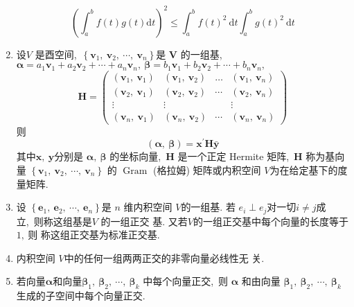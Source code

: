 \begin{enumerate}
		$$\left(\int_{a}^{b} f(t) g(t) \mathrm{d} t\right)^{2} \leqslant \int_{a}^{b} f(t)^{2} \mathrm{~d} t \int_{a}^{b} g(t)^{2} \mathrm{~d} t$$
		\item 设$  V $ 是酉空间,\  $ \left\{\boldsymbol{v}_{1},\  \boldsymbol{v}_{2},\  \cdots,\  \boldsymbol{v}_{n}\right\}  $是  $\boldsymbol{V} $ 的一组基,\   $\boldsymbol{\alpha}=   a_{1} \boldsymbol{v}_{1}+a_{2} \boldsymbol{v}_{2}+\cdots+a_{n} \boldsymbol{v}_{n},\  \boldsymbol{\beta}=b_{1} \boldsymbol{v}_{1}+b_{2} \boldsymbol{v}_{2}+\cdots+b_{n} \boldsymbol{v}_{n} ,\  $ $$\boldsymbol{H}=\left(\begin{array}{cccc}\left(\boldsymbol{v}_{1},\  \boldsymbol{v}_{1}\right) & \left(\boldsymbol{v}_{1},\  \boldsymbol{v}_{2}\right) & \ldots & \left(\boldsymbol{v}_{1},\  \boldsymbol{v}_{n}\right) \\ \left(\boldsymbol{v}_{2},\  \boldsymbol{v}_{1}\right) & \left(\boldsymbol{v}_{2},\  \boldsymbol{v}_{2}\right) & \cdots & \left(\boldsymbol{v}_{2},\  \boldsymbol{v}_{n}\right) \\ \vdots & \vdots & & \vdots \\ \left(\boldsymbol{v}_{n},\  \boldsymbol{v}_{1}\right) & \left(\boldsymbol{v}_{n},\  \boldsymbol{v}_{2}\right) & \cdots & \left(\boldsymbol{v}_{n},\  \boldsymbol{v}_{n}\right)\end{array}\right) $$ 则
		$$(\boldsymbol{\alpha},\  \boldsymbol{\beta})=\boldsymbol{x}^{\prime} \boldsymbol{H} \bar{\boldsymbol{y}}$$
		其中$  \boldsymbol{x},\  \boldsymbol{y}  $分别是 $ \boldsymbol{\alpha},\  \boldsymbol{\beta} $ 的坐标向量,\  $ \boldsymbol{H}$  是一个正定 Hermite 矩阵,\  $ \boldsymbol{H} $ 称为基向量  $\left\{\boldsymbol{v}_{1},\  \boldsymbol{v}_{2},\  \cdots,\  \boldsymbol{v}_{n}\right\}$  的  $\operatorname{Gram} $ (格拉姆) 矩阵或内积空间  $V  $为在给定基下的度 量矩阵.
		\item 设 $ \left\{\boldsymbol{e}_{1},\  \boldsymbol{e}_{2},\  \cdots,\  \boldsymbol{e}_{n}\right\}  $是  $n $ 维内积空间  $V  $的一组基. 若  $e_{i} \perp e_{j}  $对一切$  i \neq j  $成立,\  则称这组基是$  V$ 的一组正交 基. 又若$  V  $的一组正交基中每个向量的长度等于$ 1 ,\  $则 称这组正交基为标准正交基.
		\item 内积空间  $V  $中的任何一组两两正交的非零向量必线性无 关.
		\item 若向量$  \boldsymbol{\alpha}  $和向量$  \boldsymbol{\beta}_{1},\  \boldsymbol{\beta}_{2},\  \cdots,\  \boldsymbol{\beta}_{k} $ 中每个向量正交,\  则 $ \boldsymbol{\alpha}$  和由向量  $\boldsymbol{\beta}_{1},\  \boldsymbol{\beta}_{2},\  \cdots,\  \boldsymbol{\beta}_{k}  $生成的子空间中每个向量正交.

\end{enumerate}
